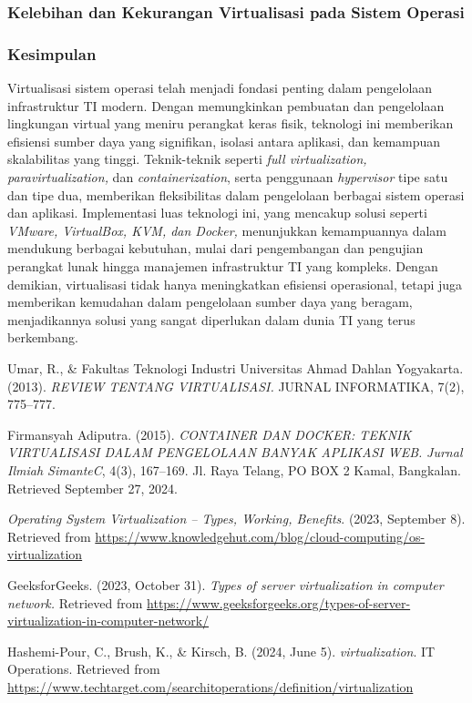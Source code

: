 \documentclass[12pt]{article}
\begin{document}
\subsubsection{Kelebihan dan Kekurangan Virtualisasi pada Sistem Operasi}
\subsubsection{Kesimpulan}
    \par Virtualisasi sistem operasi telah menjadi fondasi penting dalam pengelolaan infrastruktur TI modern. Dengan memungkinkan pembuatan dan pengelolaan lingkungan virtual yang meniru perangkat keras fisik, teknologi ini memberikan efisiensi sumber daya yang signifikan, isolasi antara aplikasi, dan kemampuan skalabilitas yang tinggi. Teknik-teknik seperti\textit{ full virtualization, paravirtualization, }dan\textit{ containerization}, serta penggunaan \textit{hypervisor} tipe satu dan tipe dua, memberikan fleksibilitas dalam pengelolaan berbagai sistem operasi dan aplikasi. Implementasi luas teknologi ini, yang mencakup solusi seperti \textit{VMware, VirtualBox, KVM, dan Docker,} menunjukkan kemampuannya dalam mendukung berbagai kebutuhan, mulai dari pengembangan dan pengujian perangkat lunak hingga manajemen infrastruktur TI yang kompleks. Dengan demikian, virtualisasi tidak hanya meningkatkan efisiensi operasional, tetapi juga memberikan kemudahan dalam pengelolaan sumber daya yang beragam, menjadikannya solusi yang sangat diperlukan dalam dunia TI yang terus berkembang.

    \begin{thebibliography}{9}
        Umar, R., \& Fakultas Teknologi Industri Universitas Ahmad Dahlan Yogyakarta. (2013).\textit{ REVIEW TENTANG VIRTUALISASI.} JURNAL INFORMATIKA, 7(2), 775–777. 
        
        Firmansyah Adiputra. (2015). \textit{CONTAINER DAN DOCKER: TEKNIK VIRTUALISASI DALAM PENGELOLAAN BANYAK APLIKASI WEB.} \textit{Jurnal Ilmiah SimanteC}, 4(3), 167–169. Jl. Raya Telang, PO BOX 2 Kamal, Bangkalan. Retrieved September 27, 2024.
        
        \textit{Operating System Virtualization – Types, Working, Benefits}. (2023, September 8). Retrieved from \url{https://www.knowledgehut.com/blog/cloud-computing/os-virtualization}
        
        GeeksforGeeks. (2023, October 31). \textit{Types of server virtualization in computer network.} Retrieved from \url{https://www.geeksforgeeks.org/types-of-server-virtualization-in-computer-network/}
        
        Hashemi-Pour, C., Brush, K., \& Kirsch, B. (2024, June 5). \textit{virtualization}. IT Operations. Retrieved from \url{https://www.techtarget.com/searchitoperations/definition/virtualization}
    \end{thebibliography}
\end{document}
